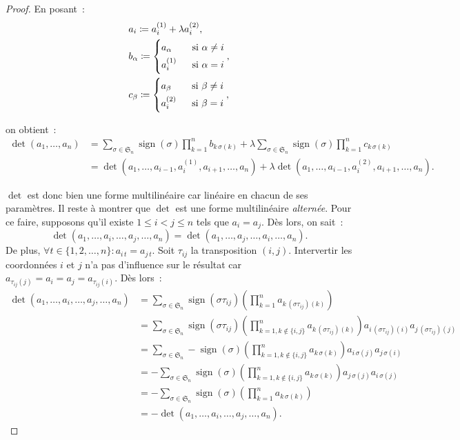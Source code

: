 \documentclass{article}
\DeclareMathOperator{\sign}{sign}
\newcommand{\Perm}{\mathfrak{S}}
\theoremstyle{definition}
\theoremstyle{remark}
\begin{document}
\begin{proof}
		En posant~:
		\[\begin{aligned}
			&a_i \coloneqq a_i^{(1)} + \lambda a_i^{(2)}, \\
			&b_\alpha \coloneqq \begin{dcases}a_\alpha \; &\text{ si } \alpha \neq i\\a_i^{(1)} \; &\text{ si } \alpha = i\end{dcases}, \\
			&c_\beta  \coloneqq \begin{dcases}a_\beta  \; &\text{ si } \beta  \neq i\\a_i^{(2)} \; &\text{ si } \beta  = i\end{dcases},
		\end{aligned}\]

		on obtient~:
		\[\begin{aligned}
			\det(a_1, \dotsc, a_n) &= \sum_{\sigma\in\Perm_n}\sign(\sigma)\prod_{k=1}^nb_{k\,\sigma(k)} + \lambda\sum_{\sigma\in\Perm_n}\sign(\sigma)\prod_{k=1}^nc_{k\,\sigma(k)} \\
			                       &= \det(a_1, \dotsc, a_{i-1}, a_i^{(1)}, a_{i+1}, \dotsc, a_n) + \lambda\det(a_1, \dotsc, a_{i-1}, a_i^{(2)}, a_{i+1}, \dotsc, a_n).
		\end{aligned}\]

		$\det$ est donc bien une forme multilinéaire car linéaire en chacun de ses paramètres. Il reste à montrer que $\det$ est une forme multilinéaire \textit{alternée}.
		Pour ce faire, supposons qu'il existe $1 \leq i < j \leq n$ tels que $a_i = a_j$. Dès lors, on sait~:
		\[\det(a_1, \dotsc, a_i, \dotsc, a_j, \dotsc, a_n) = \det(a_1, \dotsc, a_j, \dotsc, a_i, \dotsc, a_n).\]
		De plus, $\forall t \in \{1, 2, \dotsc, n\} : a_{i\,t} = a_{j\,t}$. Soit $\tau_{ij}$ la transposition $(i, j)$. Intervertir les coordonnées $i$ et $j$ n'a pas
		d'influence sur le résultat car $a_{\tau_{ij}(j)} = a_i = a_j = a_{\tau_{ij}(i)}$. Dès lors~:
		\[\begin{aligned}
			\det(a_1, \dotsc, a_i, \dotsc, a_j, \dotsc, a_n) &= \sum_{\sigma \in \Perm_n}\sign(\sigma\tau_{ij})\left(\prod_{k=1}^na_{k\,(\sigma\tau_{ij})(k)}\right) \\
				&= \sum_{\sigma\in\Perm_n}\sign(\sigma\tau_{ij})\left(\prod_{k=1, k \not \in \{i, j\}}^na_{k\,(\sigma\tau_{ij})(k)}\right)a_{i\,(\sigma\tau_{ij})(i)}a_{j\,(\sigma\tau_{ij})(j)} \\
				&= \sum_{\sigma\in\Perm_n}-\sign(\sigma)\left(\prod_{k=1, k\not\in\{i, j\}}^na_{k\,\sigma(k)}\right)a_{i\,\sigma(j)}a_{j\,\sigma(i)} \\
				&= -\sum_{\sigma\in\Perm_n}\sign(\sigma)\left(\prod_{k=1, k\not\in\{i, j\}}^na_{k\,\sigma(k)}\right)a_{j\,\sigma(j)}a_{i\,\sigma(j)} \\
				&= -\sum_{\sigma\in\Perm_n}\sign(\sigma)\left(\prod_{k=1}^na_{k\,\sigma(k)}\right) \\
				&= -\det(a_1, \dotsc, a_i, \dotsc, a_j, \dotsc, a_n).
		\end{aligned}\]


\end{proof}
\end{document}
